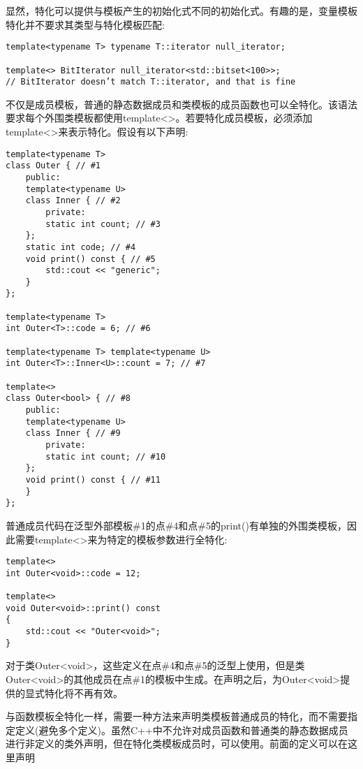 显然，特化可以提供与模板产生的初始化式不同的初始化式。有趣的是，变量模板特化并不要求其类型与特化模板匹配:

\begin{lstlisting}[style=styleCXX]
template<typename T> typename T::iterator null_iterator;

template<> BitIterator null_iterator<std::bitset<100>>;
// BitIterator doesn’t match T::iterator, and that is fine
\end{lstlisting}


不仅是成员模板，普通的静态数据成员和类模板的成员函数也可以全特化。该语法要求每个外围类模板都使用template<>。若要特化成员模板，必须添加template<>来表示特化。假设有以下声明:

\begin{lstlisting}[style=styleCXX]
template<typename T>
class Outer { // #1
	public:
	template<typename U>
	class Inner { // #2
		private:
		static int count; // #3
	};
	static int code; // #4
	void print() const { // #5
		std::cout << "generic";
	}
};

template<typename T>
int Outer<T>::code = 6; // #6

template<typename T> template<typename U>
int Outer<T>::Inner<U>::count = 7; // #7

template<>
class Outer<bool> { // #8
	public:
	template<typename U>
	class Inner { // #9
		private:
		static int count; // #10
	};
	void print() const { // #11
	}
};
\end{lstlisting}

普通成员代码在泛型外部模板\#1的点\#4和点\#5的print()有单独的外围类模板，因此需要template<>来为特定的模板参数进行全特化:

\begin{lstlisting}[style=styleCXX]
template<>
int Outer<void>::code = 12;

template<>
void Outer<void>::print() const
{
	std::cout << "Outer<void>";
}
\end{lstlisting}

对于类Outer<void>，这些定义在点\#4和点\#5的泛型上使用，但是类Outer<void>的其他成员在点\#1的模板中生成。在声明之后，为Outer<void>提供的显式特化将不再有效。

与函数模板全特化一样，需要一种方法来声明类模板普通成员的特化，而不需要指定定义(避免多个定义)。虽然C++中不允许对成员函数和普通类的静态数据成员进行非定义的类外声明，但在特化类模板成员时，可以使用。前面的定义可以在这里声明

